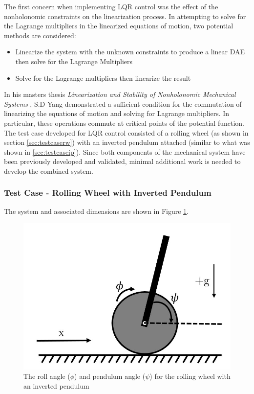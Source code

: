 The first concern when implementing LQR control was the effect of the nonholonomic constraints on the linearization process. 
In attempting to solve for the Lagrange multipliers in the linearized equations of motion, two potential methods are considered:
\begin{itemize}
	\item Linearize the system with the unknown constraints to produce a linear DAE then solve for the Lagrange Multipliers
	\item Solve for the Lagrange multipliers then linearize the result
\end{itemize}
In his masters thesis \textit{Linearization and Stability of Nonholonomic Mechanical Systems} \cite{LinNonHolo}, S.D Yang demonstrated a sufficient condition for the commutation of linearizing the equations of motion and solving for Lagrange multipliers. 
In particular, these operations commute at critical points of the potential function\cite{LinNonHolo}.
The test case developed for LQR control consisted of a rolling wheel (as shown in section \ref{sec:testcaserw}) with an inverted pendulum attached (similar to what was shown in \ref{sec:testcaseip}). 
Since both components of the mechanical system have been previously developed and validated, minimal additional work is needed to develop the combined system. 

\subsubsection{Test Case - Rolling Wheel with Inverted Pendulum}

The system and associated dimensions are shown in Figure \ref{fig:invert}.

\begin{figure}[!htb]
	\centering
	\includegraphics[width=\linewidth]{rollingwheelinvertedpendulum.JPG}
	\caption{The roll angle ($\phi$) and pendulum angle ($\psi$) for the rolling wheel with an inverted pendulum}\label{fig:invert}
	\endminipage
\end{figure}

